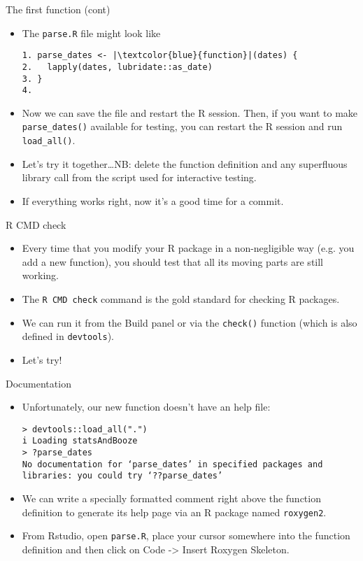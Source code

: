 \documentclass[
hyperref={bookmarks=false},
xcolor={dvipsnames,svgnames*,x11names*}, 
12pt
]{beamer}
\begin{document}
\begin{frame}[fragile]{The first function (cont)}
\vspace{-0.5cm}
\begin{itemize}
\itemsep 2ex
\item The \texttt{parse.R} file might look like 
\begin{lstlisting}
1. parse_dates <- |\textcolor{blue}{function}|(dates) {
2.   lapply(dates, lubridate::as_date)
3. }
4. 
\end{lstlisting}
\item Now we can save the file and restart the R session. Then, if you want to make \texttt{parse\_dates()} available for testing, you can restart the R session and run \texttt{load\_all()}. 
\item Let's try it together\dots \;NB: delete the function definition and any superfluous library call from the script used for interactive testing. 
\item If everything works right, now it's a good time for a commit. 
\end{itemize}
\end{frame}

\begin{frame}[fragile]{R CMD check}
\vspace{-0.5cm}
\begin{itemize}
\itemsep 3ex
\item Every time that you modify your R package in a non-negligible way (e.g. you add a new function), you should test that all its moving parts are still working. 
\item The \texttt{R CMD check} command is the gold standard for checking R packages. 
\item We can run it from the Build panel or via the \texttt{check()} function (which is also defined in \texttt{devtools}). 
\item Let's try!
\end{itemize}
\end{frame}

\begin{frame}[fragile]{Documentation}
\vspace{-0.5cm}
\begin{itemize}
\itemsep 2ex 
\item Unfortunately, our new function doesn't have an help file:
\begin{lstlisting}
> devtools::load_all(".")
i Loading statsAndBooze
> ?parse_dates
No documentation for ‘parse_dates’ in specified packages and libraries: you could try ‘??parse_dates’
\end{lstlisting}
\item We can write a specially formatted comment right above the function definition to generate its help page via an R package named \texttt{roxygen2}. 
\item From Rstudio, open \texttt{parse.R}, place your cursor somewhere into the function definition and then click on Code -> Insert Roxygen Skeleton. 
\end{itemize}
\end{frame}
\end{document}

